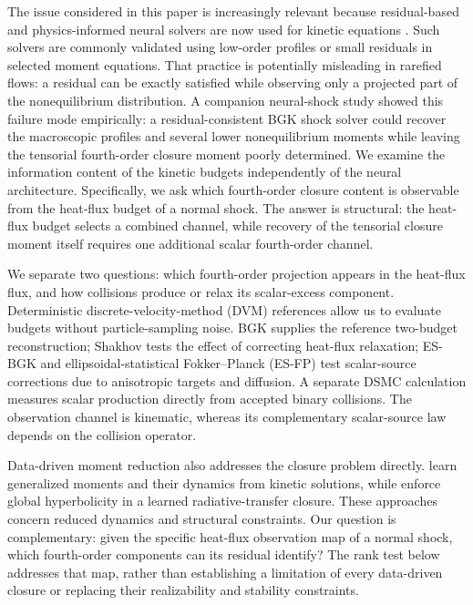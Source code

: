 \documentclass[lineno,paper]{JFM-FLM_Au}
\newenvironment{revision}{\nolinenumbers\begin{tcolorbox}[breakable,colback=revisionyellow,colframe=revisionyellow,boxrule=0pt,arc=0pt,left=5pt,right=5pt,top=5pt,bottom=5pt,before skip=6pt,after skip=6pt]\captionsetup{width=\linewidth}}{\end{tcolorbox}\linenumbers}
\newenvironment{revision}{}{}
\begin{document}
\begin{revision}
The issue considered in this paper is increasingly relevant because residual-based and physics-informed neural solvers are now used for kinetic equations \citep{Raissi2019PINN,Karniadakis2021PINNs,LouMengKarniadakis2021PINNBGK,Oh2025SPINNBGK}.  Such solvers are commonly validated using low-order profiles or small residuals in selected moment equations.  That practice is potentially misleading in rarefied flows: a residual can be exactly satisfied while observing only a projected part of the nonequilibrium distribution.  A companion neural-shock study \citep{Roohi2026NeuralShock} showed this failure mode empirically: a residual-consistent BGK shock solver could recover the macroscopic profiles and several lower nonequilibrium moments while leaving the tensorial fourth-order closure moment poorly determined.  We examine the information content of the kinetic budgets independently of the neural architecture.  Specifically, we ask which fourth-order closure content is observable from the heat-flux budget of a normal shock.  The answer is structural: the heat-flux budget selects a combined channel, while recovery of the tensorial closure moment itself requires one additional scalar fourth-order channel.
\end{revision}

\begin{revision}
We separate two questions: which fourth-order projection appears in the heat-flux flux, and how collisions produce or relax its scalar-excess component. Deterministic discrete-velocity-method (DVM) references allow us to evaluate budgets without particle-sampling noise. BGK supplies the reference two-budget reconstruction; Shakhov tests the effect of correcting heat-flux relaxation; ES-BGK and ellipsoidal-statistical Fokker--Planck (ES-FP) test scalar-source corrections due to anisotropic targets and diffusion. A separate DSMC calculation measures scalar production directly from accepted binary collisions. The observation channel is kinematic, whereas its complementary scalar-source law depends on the collision operator.
\end{revision}

\begin{revision}
Data-driven moment reduction also addresses the closure problem directly. \citet{Han2019MomentClosure} learn generalized moments and their dynamics from kinetic solutions, while \citet{Huang2023HyperbolicClosure} enforce global hyperbolicity in a learned radiative-transfer closure. These approaches concern reduced dynamics and structural constraints. Our question is complementary: given the specific heat-flux observation map of a normal shock, which fourth-order components can its residual identify? The rank test below addresses that map, rather than establishing a limitation of every data-driven closure or replacing their realizability and stability constraints.
\end{revision}
\end{document}
